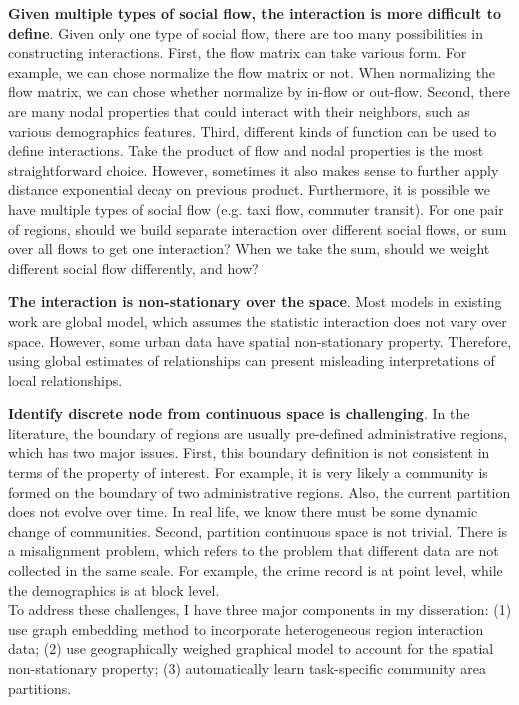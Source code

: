 \textbf{Given multiple types of social flow, the interaction is more difficult to define}. Given only one type of social flow, there are too many possibilities in constructing interactions.  First, the flow matrix can take various form. For example, we can chose normalize the flow matrix or not. When normalizing the flow matrix, we can chose whether normalize by in-flow or out-flow. Second, there are many nodal properties that could interact with their neighbors, such as various demographics features. Third, different kinds of function can be used to define interactions. Take the product of flow and nodal properties is the most straightforward choice. However, sometimes it also makes sense to further apply distance exponential decay on previous product.  Furthermore, it is possible we have multiple types of social flow (e.g. taxi flow, commuter transit). For one pair of regions, should we build separate interaction over different social flows, or sum over all flows to get one interaction? When we take the sum, should we weight different social flow differently, and how?


\textbf{The interaction is non-stationary over the space}. Most models in existing work are global model, which assumes the statistic interaction does not vary over space. However, some urban data have spatial non-stationary property. Therefore, using global estimates of relationships can present misleading interpretations of local relationships.



\textbf{Identify discrete node from continuous space is challenging}. In the literature, the boundary of regions are usually pre-defined administrative regions, which has two major issues. First, this boundary definition is not consistent in terms of the property of interest. For example, it is very likely a community is formed on the boundary of two administrative regions. Also, the current partition does not evolve over time. In real life, we know there must be some dynamic change of communities. Second, partition continuous space is not trivial. There is a misalignment problem, which refers to the problem that different data are not collected in the same scale. For example, the crime record is at point level, while the demographics is at block level. \\



To address these challenges, I have three major components in my disseration: (1) use graph embedding method to incorporate heterogeneous region interaction data; (2) use geographically weighed graphical model to account for the spatial non-stationary property; (3) automatically learn task-specific community area partitions.



